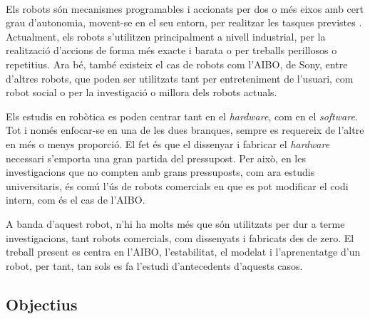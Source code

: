 \documentclass[12pt,a4paper,final,twoside]{article}
\begin{document}
\paragraph{}Els robots són mecanismes programables i accionats per dos o més eixos amb cert grau d'autonomia, movent-se en el seu entorn, per realitzar les tasques previstes \cite{ISO_Robot}. Actualment, els robots s'utilitzen principalment a nivell industrial, per la realització d'accions de forma més exacte i barata o per treballs perillosos o repetitius. Ara bé, també existeix el cas de robots com l'AIBO, de Sony, entre d'altres robots, que poden ser utilitzats tant per entreteniment de l'usuari, com robot social o per la investigació o millora dels robots actuals.

Els estudis en robòtica es poden centrar tant en el \textit{hardware}, com en el \textit{software}. Tot i només enfocar-se en una de les dues branques, sempre es requereix de l'altre en més o menys proporció. El fet és que el dissenyar i fabricar el \textit{hardware} necessari s'emporta una gran partida del pressupost. Per això, en les investigacions que no compten amb grans pressuposts, com ara estudis universitaris, és comú l'ús de robots comercials en que es pot modificar el codi intern, com és el cas de l'AIBO.

A banda d'aquest robot, n'hi ha molts més que són utilitzats per dur a terme investigacions, tant robots comercials, com dissenyats i fabricats des de zero. El treball present es centra en l'AIBO, l'estabilitat, el modelat i l'aprenentatge d'un robot, per tant, tan sols es fa l'estudi d'antecedents d'aquests casos.


\subsection{Objectius}
\label{Objectius}

\end{document}
